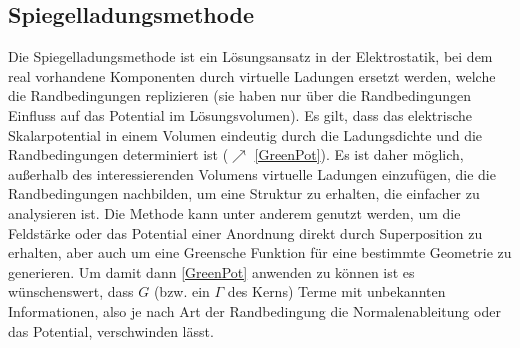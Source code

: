  \subsection{Spiegelladungsmethode}\label{spieg}
 Die Spiegelladungsmethode ist ein Lösungsansatz in der Elektrostatik, bei dem real vorhandene Komponenten durch virtuelle Ladungen ersetzt werden, welche die Randbedingungen replizieren (sie haben nur über die Randbedingungen Einfluss auf das Potential im Lösungsvolumen). Es gilt, dass das elektrische Skalarpotential in einem Volumen eindeutig durch die Ladungsdichte und die Randbedingungen determiniert ist ($\nearrow$ \ref{GreenPot}). Es ist daher möglich, außerhalb des interessierenden Volumens virtuelle Ladungen einzufügen, die die Randbedingungen nachbilden, um eine Struktur zu erhalten, die einfacher zu analysieren ist. Die Methode kann unter anderem genutzt werden, um die Feldstärke oder das Potential einer Anordnung direkt durch Superposition zu erhalten, aber auch um eine Greensche Funktion für eine bestimmte Geometrie zu generieren. Um damit dann \ref{GreenPot} anwenden zu können ist es wünschenswert, dass $G$ (bzw. ein $\Gamma$ des Kerns) Terme mit unbekannten Informationen, also je nach Art der Randbedingung die Normalenableitung oder das Potential, verschwinden lässt. 
